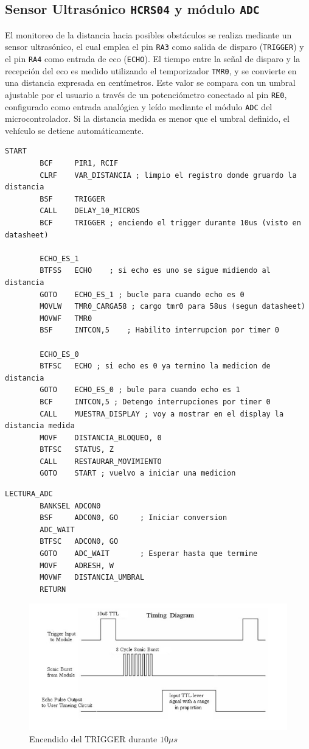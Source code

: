 \documentclass[]{article}
\begin{document}
	\subsection{Sensor Ultrasónico \texttt{HCRS04} y módulo \texttt{ADC}}
	El monitoreo de la distancia hacia posibles obstáculos se realiza mediante un sensor ultrasónico, el cual emplea el pin \texttt{RA3} como salida de disparo (\texttt{TRIGGER}) y el pin \texttt{RA4} como entrada de eco (\texttt{ECHO}). El tiempo entre la señal de disparo y la recepción del eco es medido utilizando el temporizador \texttt{TMR0}, y se convierte en una distancia expresada en centímetros. Este valor se compara con un umbral ajustable por el usuario a través de un potenciómetro conectado al pin \texttt{RE0}, configurado como entrada analógica y leído mediante el módulo \texttt{ADC} del microcontrolador. Si la distancia medida es menor que el umbral definido, el vehículo se detiene automáticamente.
	\begin{lstlisting}[caption={Medición de distancia con sensor ultrasónico}, label={lst:ultrasónico}]
		START 
		BCF	    PIR1, RCIF
		CLRF    VAR_DISTANCIA ; limpio el registro donde gruardo la distancia
		BSF	    TRIGGER
		CALL    DELAY_10_MICROS
		BCF	    TRIGGER ; enciendo el trigger durante 10us (visto en datasheet)
		
		ECHO_ES_1
		BTFSS   ECHO    ; si echo es uno se sigue midiendo al distancia
		GOTO    ECHO_ES_1 ; bucle para cuando echo es 0
		MOVLW   TMR0_CARGA58 ; cargo tmr0 para 58us (segun datasheet)
		MOVWF   TMR0
		BSF	    INTCON,5	; Habilito interrupcion por timer 0
		
		ECHO_ES_0
		BTFSC   ECHO ; si echo es 0 ya termino la medicion de distancia
		GOTO    ECHO_ES_0 ; bule para cuando echo es 1
		BCF	    INTCON,5 ; Detengo interrupciones por timer 0
		CALL    MUESTRA_DISPLAY ; voy a mostrar en el display la distancia medida
		MOVF    DISTANCIA_BLOQUEO, 0
		BTFSC   STATUS, Z
		CALL    RESTAURAR_MOVIMIENTO
		GOTO    START ; vuelvo a iniciar una medicion
	\end{lstlisting}
	\begin{lstlisting}[caption={Lectura del valor del potenciómetro mediante el ADC}, label={lst:adc}]
		LECTURA_ADC
		BANKSEL ADCON0
		BSF     ADCON0, GO     ; Iniciar conversion
		ADC_WAIT
		BTFSC   ADCON0, GO
		GOTO    ADC_WAIT       ; Esperar hasta que termine
		MOVF    ADRESH, W
		MOVWF   DISTANCIA_UMBRAL
		RETURN
	\end{lstlisting}
	
	\begin{figure}[h!]
		\centering
		\includegraphics[width=0.7\linewidth]{Figuras/ultrasonico}
		\caption{Encendido del TRIGGER durante $10\mu s$}
		\label{fig:ultrasonico}
	\end{figure}
	
\end{document}
